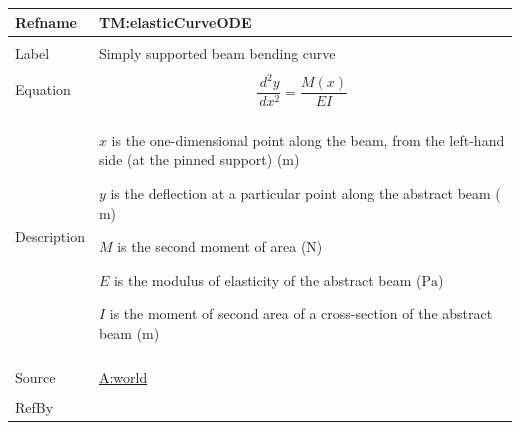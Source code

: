 \documentclass[12pt]{article}
\begin{document}
\begin{minipage}{\textwidth}
\begin{tabular}{>{\raggedright}p{}>{\raggedright\arraybackslash}p{}}
\toprule \textbf{Refname} & \textbf{TM:elasticCurveODE}
\label{TM:elasticCurveODE}
\\ \midrule \\
Label & Simply supported beam bending curve
        
\\ \midrule \\
Equation & \begin{displaymath}
           \frac{\,d^{2}y}{\,dx^{2}}=\frac{M\left(x\right)}{E I}
           \end{displaymath}
\\ \midrule \\
Description & \begin{symbDescription}
              \item{$x$ is the one-dimensional point along the beam, from the left-hand side (at the pinned support) (${\text{m}}$)}
              \item{$y$ is the deflection at a particular point along the abstract beam (${\text{m}}$)}
              \item{$M$ is the second moment of area (${\text{N}}$)}
              \item{$E$ is the modulus of elasticity of the abstract beam (${\text{Pa}}$)}
              \item{$I$ is the moment of second area of a cross-section of the abstract beam (${\text{m}}$)}
              \end{symbDescription}
\\ \midrule \\
Source & \hyperref[world]{A:world}
         
\\ \midrule \\
RefBy & 
\\ \bottomrule
\end{tabular}
\end{minipage}
\vspace{\baselineskip}
\noindent
\end{document}
